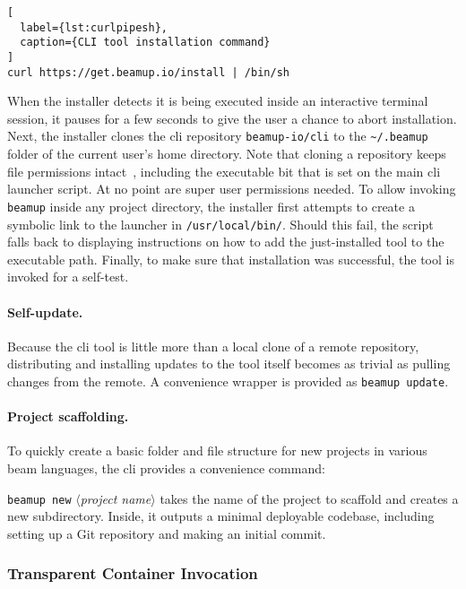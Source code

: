 \begin{lstlisting}[
  label={lst:curlpipesh},
  caption={CLI tool installation command}
]
curl https://get.beamup.io/install | /bin/sh
\end{lstlisting}

When the installer detects it is being executed inside an interactive terminal session, it pauses for a few seconds to give the user a chance to abort installation. Next, the installer clones the \acrshort{cli} repository \lstinline|beamup-io/cli| to the \lstinline|~/.beamup| folder of the current user's home directory. Note that cloning a repository keeps file permissions intact~\cite{sink2011version}, including the executable bit that is set on the main \acrshort{cli} launcher script. At no point are super user permissions needed. To allow invoking \lstinline|beamup| inside any project directory, the installer first attempts to create a symbolic link to the launcher in \lstinline|/usr/local/bin/|. Should this fail, the script falls back to displaying instructions on how to add the just-installed tool to the executable path. Finally, to make sure that installation was successful, the tool is invoked for a self-test.

\paragraph{Self-update.} Because the \acrshort{cli} tool is little more than a local clone of a remote repository, distributing and installing updates to the tool itself becomes as trivial as pulling changes from the remote. A convenience wrapper is provided as \lstinline|beamup update|.

\paragraph{Project scaffolding.} To quickly create a basic folder and file structure for new projects in various \acrshort{beam} languages, the \acrshort{cli} provides a convenience command:

\lstinline|beamup new| $\langle$\emph{project name}$\rangle$ takes the name of the project to scaffold and creates a new subdirectory. Inside, it outputs a minimal deployable codebase, including setting up a Git repository and making an initial commit.

\subsubsection{Transparent Container Invocation}

